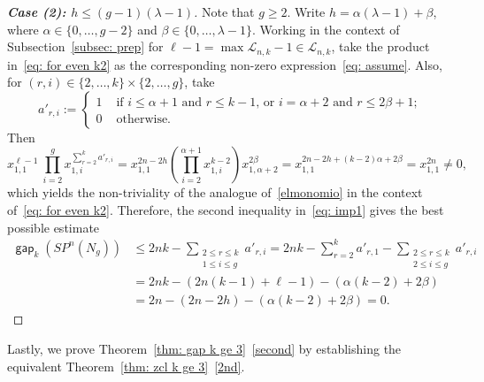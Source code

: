\documentclass[amscd,amssymb,verbatim,10pt]{amsart}
\numberwithin{equation}{section}
\theoremstyle{plain}
\theoremstyle{definition}
\DeclareMathOperator{\gap}{{\mathsf{gap}}}
\begin{document}
\begin{proof}[\textbf{Case (2): $h\le (g-1)(\lambda-1)$}]
   Note that $g\geq2$. Write $h=\alpha(\lambda-1)+\beta$, where $\alpha\in \{0,\ldots,g-2\}$ and $\beta\in \{0,\ldots,\lambda-1\}$. Working in the context of Subsection~\ref{subsec: prep} for $\ell-1=\max\mathcal{L}_{n,k}-1\in\mathcal{L}_{n,k}$, take the product in~\eqref{eq: for even k2} as the corresponding non-zero expression~\eqref{eq: assume}. Also, for $(r,i)\in\{2,\ldots,k\}\times\{2,\ldots,g\}$, take
   \[
a'_{r,i}:=\begin{cases}
1 & \text{ if $i\leq \alpha+1$ and $r\leq k-1$, or $i=\alpha+2$ and $r\leq 2\beta+1$;} \\
0 & \text{ otherwise.}
\end{cases}
   \]
Then
    \[
    x_{1,1}^{\ell-1}\ \prod_{i=2}^gx_{1,i}^{\sum_{r=2}^{k}a'_{r,i}}=x_{1,1}^{2n-2h}\left(\prod_{i=2}^{\alpha+1}x_{1,i}^{k-2} \right) x_{1,\alpha+2}^{2\beta}=x_{1,1}^{2n-2h+(k-2)\alpha+2\beta}=x_{1,1}^{2n}\ne 0,
    \]
    which yields the non-triviality of the analogue of~\eqref{elmonomio} in the context of~\eqref{eq: for even k2}. Therefore, the second inequality in~\eqref{eq: imp1} gives the best possible estimate 
    \begin{align*}\gap_k(SP^n(N_g))&\le 2nk-\sum_{\substack{2\le r\le k \\ 1\le i \le g}} a'_{r,i}=2nk- \sum_{r=2}^k a'_{r,1}-\sum_{\substack{2\le r\le k \\ 2\le i \le g}} a'_{r,i}\\ &=2nk-(2n(k-1)+\ell-1)-(\alpha(k-2)+2\beta)\\&=2n -(2n-2h)-(\alpha(k-2)+2\beta)=0.
    \end{align*}
\end{proof}

Lastly, we prove Theorem~\ref{thm: gap k ge 3}~\eqref{second} by establishing the equivalent Theorem~\ref{thm: zcl k ge 3}~\eqref{2nd}. 
\end{document}
